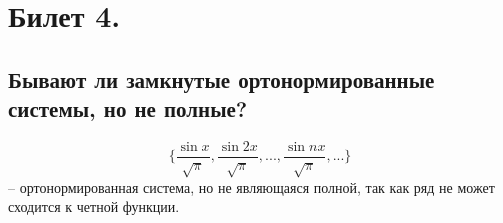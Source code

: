 \section{Билет 4.}

\subsection{Бывают ли замкнутые ортонормированные системы, но не полные?}
$$\{
    \frac{\sin x}{\sqrt{\pi}},
    \frac{\sin 2x}{\sqrt{\pi}},
    ...,
    \frac{\sin nx}{\sqrt{\pi}},
    ...
\}$$ -- ортонормированная система, но не являющаяся полной, так как ряд не может сходится к четной функции.